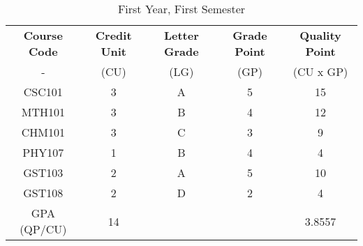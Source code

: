 \documentclass{article}
\begin{document}
	\begin{table}[h!]
		\begin{center}
			\caption{First Year, First Semester}
			\label{tab:table1}
		 \begin{tabular}{ccccc}
				\cellcolor{pink!20}\textbf{Course Code} & \cellcolor{pink!20}\textbf{Credit Unit} & \cellcolor{pink!20}\textbf{Letter Grade} & \cellcolor{pink!20}\textbf{Grade Point} & \cellcolor{pink!20}\textbf{Quality Point}\\
				\cellcolor{purple!20}- & \cellcolor{purple!20}(CU) & \cellcolor{purple!20}(LG) & \cellcolor{purple!20}(GP) & \cellcolor{purple!20}(CU x GP)\\ 
				\hline
				\cellcolor{purple!50}CSC101 & 3 & A & 5 & 15\\
				\cellcolor{purple!20}MTH101 & 3 & B & 4 & 12\\
				\cellcolor{purple!50}CHM101 & 3 & C & 3 & 9\\
				\cellcolor{purple!20}PHY107 & 1 & B & 4 & 4\\
				\cellcolor{purple!50}GST103 & 2 & A & 5 & 10\\
				\cellcolor{purple!20}GST108 & 2 & D & 2 & 4\\
				\hline
				\cellcolor{pink!20}GPA (QP/CU) & \cellcolor{pink!20}14 &\cellcolor{pink!20} & \cellcolor{pink!20}& \cellcolor{pink!20}3.8557\\
				\hline
			\end{tabular} 
		\end{center}
	\end{table}
\end{document}
